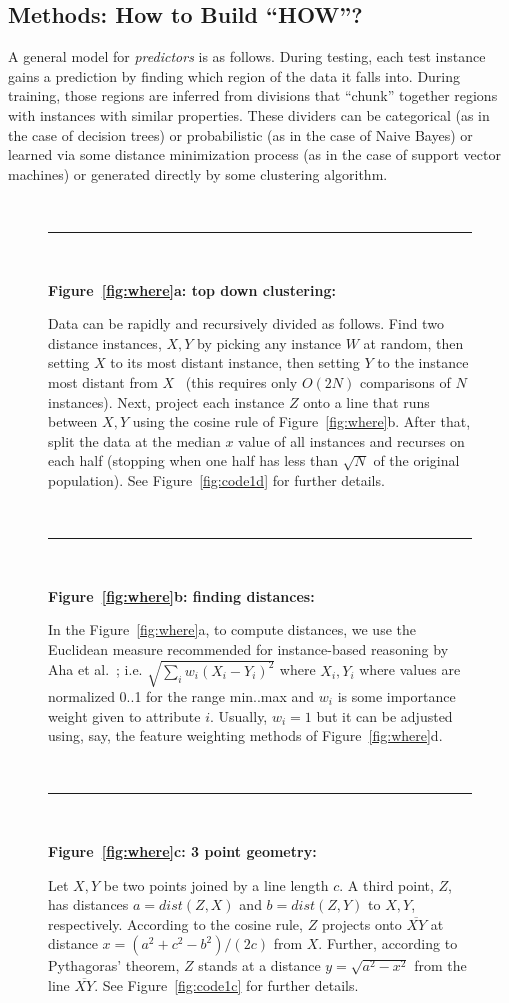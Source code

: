 \documentclass[conference]{IEEEtran}
\newcommand{\fig}[1]{Figure~\ref{fig:#1}}
\begin{document}
\subsection{Methods: How to Build ``HOW''?}

A general model for {\em predictors} is as follows. 
During testing, each test instance gains a prediction 
by finding which region of the data it falls into.
During training, those regions are inferred from
divisions that ``chunk'' together regions with instances
with similar properties. These dividers can be categorical (as in the case of decision trees) or probabilistic (as in the
case of Naive Bayes) or learned via some distance minimization
process 
(as in the case of support vector machines) or generated
directly by some clustering algorithm. 


\begin{figure}[t!]
\small
~\hrule~

{\bf \fig{where}a: top down clustering:}

Data can be rapidly and recursively divided   as follows.
Find   two   distance instances,  $X,Y$
by picking any instance $W$ at random, then setting $X$ to its most
distant instance, then setting $Y$ to the instance most distant from
$X$~\cite{fastmap}
(this requires only $O(2N)$ comparisons
of $N$ instances).
Next, project each instance $Z$
onto a line that  runs between $X,Y$ using the cosine
rule of \fig{where}b. After that,  split the data at the median $x$ value of all instances and
recurses on each half  (stopping when
one half has less  than $\sqrt{N}$ of the original population). See \fig{code1d} for further details.

~\hrule~
 
{\bf \fig{where}b: finding distances:}

In the \fig{where}a, to compute distances, we use
the Euclidean measure recommended for
instance-based reasoning by Aha et al.~\cite{aha91};
i.e. $\sqrt{\sum_iw_i(X_i-Y_i)^2}$ where $X_i,Y_i$
where values are  normalized 0..1 for the range min..max and 
$w_i$ is some importance weight given to attribute $i$.
Usually, $w_i=1$ but it can be adjusted using, say,
the feature weighting methods of \fig{where}d.
 
 ~\hrule~
 
{\bf \fig{where}c: 3 point geometry:}
 
Let   $X,Y$ be two points joined by  a line  length $c$.
A third point, $Z$, has distances  $a=dist(Z,X)$ and
$b=dist(Z,Y)$ to $X,Y$, respectively.
According to the cosine rule,   $Z$ projects onto  $\overline{XY}$
at distance $x=(a^2 + c^2 - b^2)/(2c)$ from $X$.
Further, according to Pythagoras' theorem, $Z$ stands at a distance
$y = \sqrt{a^2 - x^2}$ from the line $\overline{XY}$. See \fig{code1c} for further details.


\end{figure}
\end{document}
